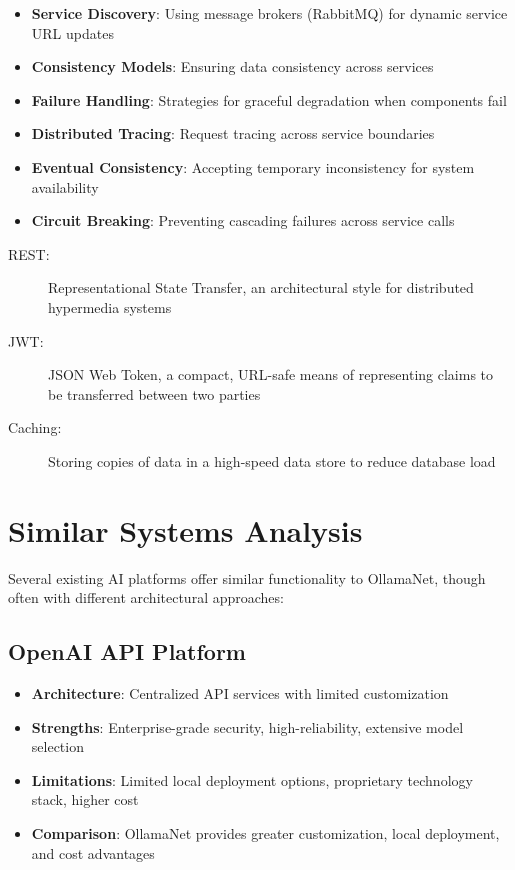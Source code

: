 \begin{itemize}
    \item \textbf{Service Discovery}: Using message brokers (RabbitMQ) for dynamic service URL updates
    \item \textbf{Consistency Models}: Ensuring data consistency across services
    \item \textbf{Failure Handling}: Strategies for graceful degradation when components fail
    \item \textbf{Distributed Tracing}: Request tracing across service boundaries
    \item \textbf{Eventual Consistency}: Accepting temporary inconsistency for system availability
    \item \textbf{Circuit Breaking}: Preventing cascading failures across service calls
\end{itemize}

\begin{terminology}
\begin{description}
    \item[REST:] Representational State Transfer, an architectural style for distributed hypermedia systems
    \item[JWT:] JSON Web Token, a compact, URL-safe means of representing claims to be transferred between two parties
    \item[Caching:] Storing copies of data in a high-speed data store to reduce database load
\end{description}
\end{terminology}

\section{Similar Systems Analysis}

Several existing AI platforms offer similar functionality to OllamaNet, though often with different architectural approaches:

\subsection*{OpenAI API Platform}
\begin{itemize}
    \item \textbf{Architecture}: Centralized API services with limited customization
    \item \textbf{Strengths}: Enterprise-grade security, high-reliability, extensive model selection
    \item \textbf{Limitations}: Limited local deployment options, proprietary technology stack, higher cost
    \item \textbf{Comparison}: OllamaNet provides greater customization, local deployment, and cost advantages
\end{itemize}

